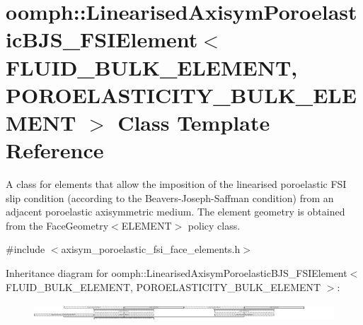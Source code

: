 \hypertarget{classoomph_1_1LinearisedAxisymPoroelasticBJS__FSIElement}{}\section{oomph\+:\+:Linearised\+Axisym\+Poroelastic\+B\+J\+S\+\_\+\+F\+S\+I\+Element$<$ F\+L\+U\+I\+D\+\_\+\+B\+U\+L\+K\+\_\+\+E\+L\+E\+M\+E\+NT, P\+O\+R\+O\+E\+L\+A\+S\+T\+I\+C\+I\+T\+Y\+\_\+\+B\+U\+L\+K\+\_\+\+E\+L\+E\+M\+E\+NT $>$ Class Template Reference}
\label{classoomph_1_1LinearisedAxisymPoroelasticBJS__FSIElement}


A class for elements that allow the imposition of the linearised poroelastic F\+SI slip condition (according to the Beavers-\/\+Joseph-\/\+Saffman condition) from an adjacent poroelastic axisymmetric medium. The element geometry is obtained from the Face\+Geometry$<$\+E\+L\+E\+M\+E\+N\+T$>$ policy class.  




{\ttfamily \#include $<$axisym\+\_\+poroelastic\+\_\+fsi\+\_\+face\+\_\+elements.\+h$>$}

Inheritance diagram for oomph\+:\+:Linearised\+Axisym\+Poroelastic\+B\+J\+S\+\_\+\+F\+S\+I\+Element$<$ F\+L\+U\+I\+D\+\_\+\+B\+U\+L\+K\+\_\+\+E\+L\+E\+M\+E\+NT, P\+O\+R\+O\+E\+L\+A\+S\+T\+I\+C\+I\+T\+Y\+\_\+\+B\+U\+L\+K\+\_\+\+E\+L\+E\+M\+E\+NT $>$\+:\begin{figure}[H]
\begin{center}
\leavevmode
\includegraphics[height=0.641834cm]{classoomph_1_1LinearisedAxisymPoroelasticBJS__FSIElement}
\end{center}
\end{figure}

